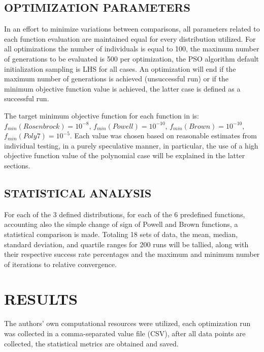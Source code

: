 \documentclass[10pt,fleqn,a4paper,twoside]{article}
\begin{document}
\subsection{OPTIMIZATION PARAMETERS}

In an effort to minimize variations between comparisons, all parameters related to each function evaluation are maintained equal for every distribution utilized. For all optimizations the number of 
individuals is equal to 100, the maximum number of generations to be evaluated is 500 per optimization, the PSO algorithm default initialization sampling is LHS for all cases. An optimization
will end if the maximum number of generations is achieved (unsuccessful run) or if the minimum objective function value is achieved, the latter case is defined as a successful run.

The target minimum objective function for each function in is: $f_{min}(Rosenbrock) = 10^{-8}$, $f_{min}(Powell) = 10^{-10}$, $f_{min}(Brown) = 10^{-10}$, $f_{min}(Poly7) =  10^{-5}$. Each value was chosen based 
on reasonable estimates from individual testing, in a purely speculative manner, in particular, the use of a high objective function value of the polynomial case will be explained
in the latter sections.

\subsection{STATISTICAL ANALYSIS}

For each of the 3 defined distributions, for each of the 6 predefined functions, accounting also the simple change of sign of Powell and Brown functions, a statistical comparison is made.
Totaling 18 sets of data, the mean, median, standard deviation, and quartile ranges for 200 runs will be tallied, along with their respective success rate percentages and the maximum and minimum 
number of iterations to relative convergence. 

\section{RESULTS}

The authors' own computational resources were utilized, each optimization run was collected in a comma-separated value file (CSV), after all data points are collected, the statistical metrics
are obtained and saved.%
\end{document}
